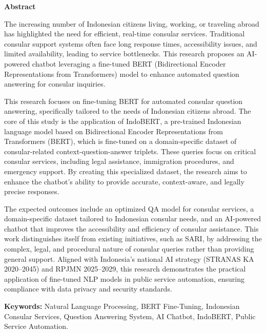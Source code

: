 \documentclass[a4paper,12pt]{report}
\begin{document}
\begin{center}
  \textbf{Abstract}
\end{center}
\begin{spacing}{1.5} %

The increasing number of Indonesian citizens living, working, or traveling abroad has highlighted the need for efficient, real-time consular services. Traditional consular support systems often face long response times, accessibility issues, and limited availability, leading to service bottlenecks. This research proposes an AI-powered chatbot leveraging a fine-tuned BERT (Bidirectional Encoder Representations from Transformers) model to enhance automated question answering for consular inquiries.

This research focuses on fine-tuning BERT for automated consular question answering, specifically tailored to the needs of Indonesian citizens abroad. The core of this study is the application of IndoBERT, a pre-trained Indonesian language model based on Bidirectional Encoder Representations from Transformers (BERT), which is fine-tuned on a domain-specific dataset of consular-related context-question-answer triplets. These queries focus on critical consular services, including legal assistance, immigration procedures, and emergency support. By creating this specialized dataset, the research aims to enhance the chatbot's ability to provide accurate, context-aware, and legally precise responses.

The expected outcomes include an optimized QA model for consular services, a domain-specific dataset tailored to Indonesian consular needs, and an AI-powered chatbot that improves the accessibility and efficiency of consular assistance. This work distinguishes itself from existing initiatives, such as SARI, by addressing the complex, legal, and procedural nature of consular queries rather than providing general support. Aligned with Indonesia’s national AI strategy (STRANAS KA 2020–2045) and RPJMN 2025–2029, this research demonstrates the practical application of fine-tuned NLP models in public service automation, ensuring compliance with data privacy and security standards.

\textbf{Keywords:} Natural Language Processing, BERT Fine-Tuning, Indonesian Consular Services, Question Answering System, AI Chatbot, IndoBERT, Public Service Automation.
\end{spacing}

\newpage
\end{document}
